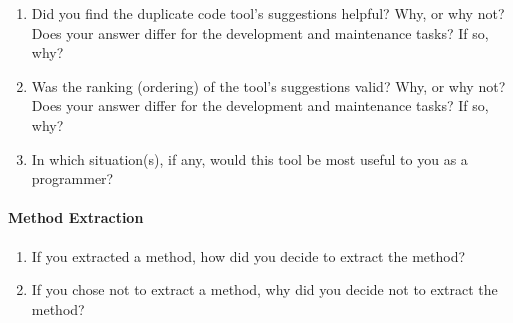 \documentclass[12pt]{article}
\begin{document}
\begin{enumerate}
  \item Did you find the duplicate code tool's suggestions helpful?
    Why, or why not? Does your answer differ for the development and
    maintenance tasks? If so, why?
  \item Was the ranking (ordering) of the tool's suggestions valid?
    Why, or why not? Does your answer differ for the development and
    maintenance tasks? If so, why?
  \item In which situation(s), if any, would this tool be most useful
  to you as a programmer?
\end{enumerate}

\paragraph{Method Extraction}

\begin{enumerate}
  \item If you extracted a method, how did you decide to extract the
    method? 
  \item If you chose not to extract a method, why did you decide not
    to extract the method?
\end{enumerate}
\end{document}
